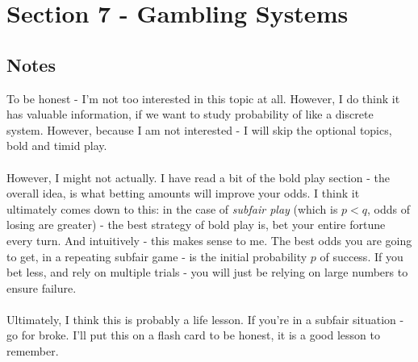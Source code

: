 \documentclass[12pt,a4paper]{article}
\newcommand{\1}[1]{\mathbbm{1}\left\{ #1 \right\}}
\begin{document}
\section{Section 7 - Gambling Systems}
\subsection{Notes}
To be honest - I'm not too interested in this topic at all. However, I do think it has valuable information, if we want to study probability of like a discrete system. However, because I am not interested - I will skip the optional topics, bold and timid play.
\\\\
However, I might not actually. I have read a bit of the bold play section - the overall idea, is what betting amounts will improve your odds. I think it ultimately comes down to this: in the case of \textit{subfair play} (which is $p < q$, odds of losing are greater) - the best strategy of bold play is, bet your entire fortune every turn. And intuitively - this makes sense to me. The best odds you are going to get, in a repeating subfair game - is the initial probability $p$ of success. If you bet less, and rely on multiple trials - you will just be relying on large numbers to ensure failure.
\\\\
Ultimately, I think this is probably a life lesson. If you're in a subfair situation - go for broke. I'll put this on a flash card to be honest, it is a good lesson to remember.
\end{document}
